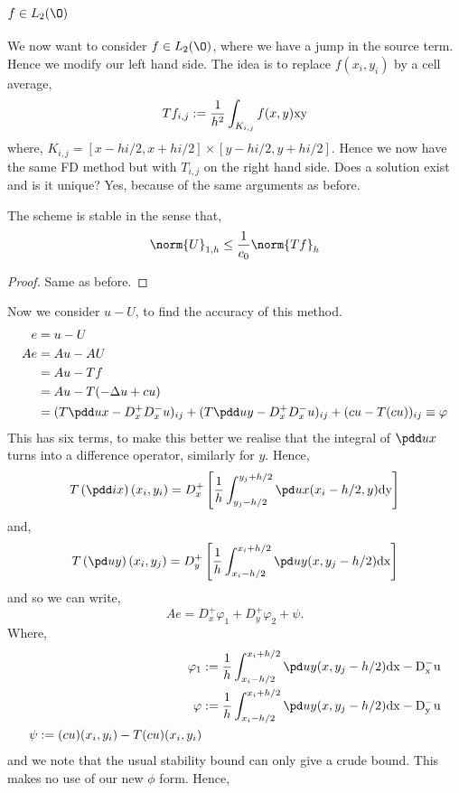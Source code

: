 
\subsection{$f \in L_2(\O)$}
We now want to consider $f \in L_2(\O)$, where we have a jump in the source term. Hence we modify our left hand side. The idea is to replace $f(x_i, y_i)$ by a cell average,
$$ Tf_{i,j} := \frac{1}{h^2}\int_{K_{i,j}} f(x, y)\rm x \rm y $$
where, $K_{i,j} = [x - hi/2, x + hi/2] \times [y - hi/2, y + hi/2]$. Hence we now have the same FD method but with $T_{i,j}$ on the right hand side. Does a solution exist and is it unique? Yes, because of the same arguments as before.

\begin{nthm}
  The scheme is stable in the sense that,
  $$\norm{U}_{1,h} \le \frac{1}{c_0}\norm{Tf}_{h}$$
\end{nthm}
\begin{proof}
  Same as before.
\end{proof}
\noindent
Now we consider $u - U$, to find the accuracy of this method.
\begin{align*}
  e &= u - U \\
  Ae &= Au - AU \\
  &= Au - Tf \\
  &=Au - T(-\Delta u + cu) \\
  &= (T\pdd u x - D_x^+D_x^- u)_{ij} + (T\pdd u y - D_x^+D_x^- u)_{ij} + (cu - T(cu))_{ij} \equiv \varphi
\end{align*}
This has six terms, to make this better we realise that the integral of $\pdd u x$ turns into a difference operator, similarly for $y$. Hence,
$$ T\left( \pdd i x \right)(x_i, y_i) = D_x^+ \left[ \frac{1}{h}\int_{y_j-h/2}^{y_j + h/2} \pd u x (x_i - h/2, y)\rm d y \right] $$
and,
$$ T\left(\pd u y \right)(x_i, y_j) = D_y^+ \left[ \frac{1}{h}\int_{x_i-h/2}^{x_i + h/2} \pd u y (x, y_j - h/2) \rm d x \right] $$
and so we can write,
$$ Ae = D_x^+ \varphi_1 + D_y^+ \varphi_2 + \psi. $$
Where,
\begin{align*}
  \varphi_1 &:=  \frac{1}{h}\int_{x_i-h/2}^{x_i + h/2} \pd u y (x, y_j - h/2) \rm d x - D_x^- u \\
  \varphi &:= \frac{1}{h}\int_{x_i-h/2}^{x_i + h/2} \pd u y (x, y_j - h/2) \rm d x - D_y^-u \\
  \psi := (cu)(x_i, y_i) - T(cu)(x_i, y_i)
\end{align*}
and we note that the usual stability bound can only give a crude bound. This makes no use of our new $\phi$ form. Hence,
